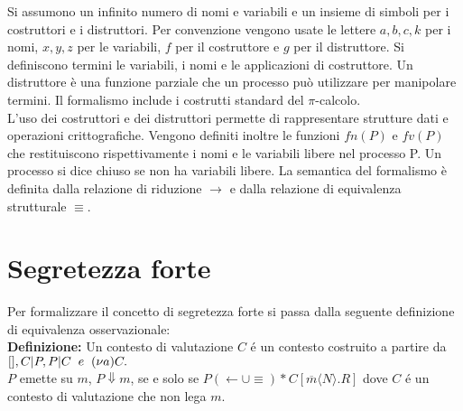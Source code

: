 \documentclass[12pt]{report}
\begin{document}
Si assumono un infinito numero di nomi e variabili e un insieme di simboli per i costruttori e i distruttori. Per convenzione vengono usate le lettere $a, b, c, k$ per i nomi, $x, y, z$ per le variabili, $f$ per il costruttore e $g$ per il distruttore. Si definiscono termini le variabili, i nomi e le applicazioni di costruttore. Un distruttore è una funzione parziale che un processo può utilizzare per manipolare termini. Il formalismo include i costrutti standard del $\pi$-calcolo.\\
L'uso dei costruttori e dei distruttori permette di rappresentare strutture dati e operazioni crittografiche. Vengono definiti inoltre le funzioni $fn(P)$ e $fv(P)$ che restituiscono rispettivamente i nomi e le variabili libere nel processo P. Un processo si dice chiuso se non ha variabili libere. La semantica del formalismo è definita dalla relazione di riduzione $ \xrightarrow{} $ e dalla relazione di equivalenza strutturale $ \equiv$.
\section*{Segretezza forte}
Per formalizzare il concetto di segretezza forte si passa dalla seguente definizione di equivalenza osservazionale:\\

\textbf{Definizione:}  Un contesto di valutazione $C$ é un contesto costruito a partire da $[], C | P, P|C \hspace{2mm}e\hspace{2mm} (\nu a)C.$\\
$P$ emette su $m$, $P \Downarrow m$, se e solo se $P (\leftarrow \cup \equiv)* C[\overline{m}\langle N \rangle.R]$ dove $C$ é un contesto di valutazione che non lega $m$.\\
\end{document}
